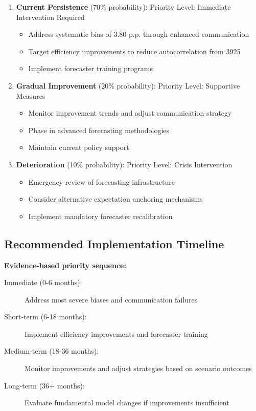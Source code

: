 \documentclass[11pt,a4paper]{article}
\begin{document}
\begin{enumerate}
\item \textbf{Current Persistence} (70\% probability):
Priority Level: Immediate Intervention Required
\begin{itemize}
  \item Address systematic bias of 3.80 p.p. through enhanced communication
  \item Target efficiency improvements to reduce autocorrelation from 3925
  \item Implement forecaster training programs
\end{itemize}
\item \textbf{Gradual Improvement} (20\% probability):
Priority Level: Supportive Measures
\begin{itemize}
  \item Monitor improvement trends and adjust communication strategy
  \item Phase in advanced forecasting methodologies
  \item Maintain current policy support
\end{itemize}
\item \textbf{Deterioration} (10\% probability):
Priority Level: Crisis Intervention
\begin{itemize}
\item Emergency review of forecasting infrastructure
\item Consider alternative expectation anchoring mechanisms
\item Implement mandatory forecaster recalibration
\end{itemize}
\end{enumerate}

\subsection{Recommended Implementation Timeline}
\textbf{Evidence-based priority sequence:}

\begin{description}
  \item[Immediate (0-6 months):] Address most severe biases and communication failures
  \item[Short-term (6-18 months):] Implement efficiency improvements and forecaster training
  \item[Medium-term (18-36 months):] Monitor improvements and adjust strategies based on scenario outcomes
  \item[Long-term (36+ months):] Evaluate fundamental model changes if improvements insufficient
\end{description}
\end{document}
